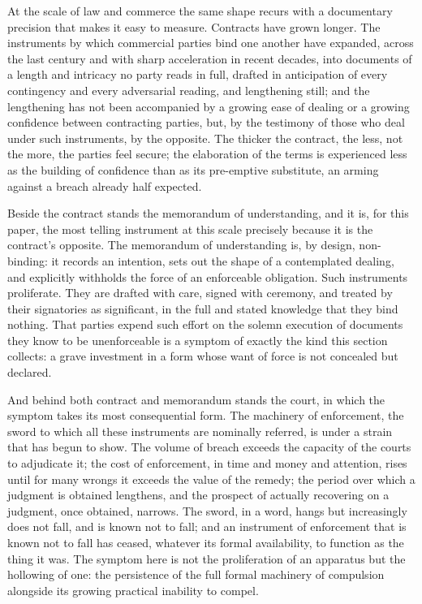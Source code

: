 At the scale of law and commerce the same shape recurs with a documentary precision that makes it easy to measure. Contracts have grown longer. The instruments by which commercial parties bind one another have expanded, across the last century and with sharp acceleration in recent decades, into documents of a length and intricacy no party reads in full, drafted in anticipation of every contingency and every adversarial reading, and lengthening still; and the lengthening has not been accompanied by a growing ease of dealing or a growing confidence between contracting parties, but, by the testimony of those who deal under such instruments, by the opposite. The thicker the contract, the less, not the more, the parties feel secure; the elaboration of the terms is experienced less as the building of confidence than as its pre-emptive substitute, an arming against a breach already half expected.

Beside the contract stands the memorandum of understanding, and it is, for this paper, the most telling instrument at this scale precisely because it is the contract's opposite. The memorandum of understanding is, by design, non-binding: it records an intention, sets out the shape of a contemplated dealing, and explicitly withholds the force of an enforceable obligation. Such instruments proliferate. They are drafted with care, signed with ceremony, and treated by their signatories as significant, in the full and stated knowledge that they bind nothing. That parties expend such effort on the solemn execution of documents they know to be unenforceable is a symptom of exactly the kind this section collects: a grave investment in a form whose want of force is not concealed but declared.

And behind both contract and memorandum stands the court, in which the symptom takes its most consequential form. The machinery of enforcement, the sword to which all these instruments are nominally referred, is under a strain that has begun to show. The volume of breach exceeds the capacity of the courts to adjudicate it; the cost of enforcement, in time and money and attention, rises until for many wrongs it exceeds the value of the remedy; the period over which a judgment is obtained lengthens, and the prospect of actually recovering on a judgment, once obtained, narrows. The sword, in a word, hangs but increasingly does not fall, and is known not to fall; and an instrument of enforcement that is known not to fall has ceased, whatever its formal availability, to function as the thing it was. The symptom here is not the proliferation of an apparatus but the hollowing of one: the persistence of the full formal machinery of compulsion alongside its growing practical inability to compel.

